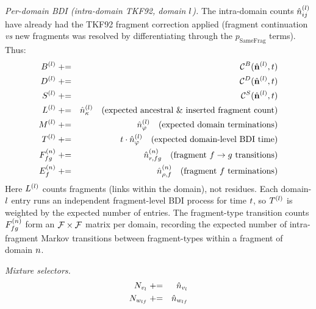 \emph{Per-domain BDI (intra-domain TKF92, domain $l$).}
The intra-domain counts $\hat{n}^{(l)}_{ij}$ have already had the TKF92 fragment correction applied
(fragment continuation {\em vs} new fragments was resolved by differentiating through the $p_\text{SameFrag}$ terms).
Thus:
\begin{eqnarray*}
B^{(l)} & \mathrel{+}= & \mathcal{C}^B(\hat{\bf n}^{(l)},t) \\
D^{(l)} & \mathrel{+}= & \mathcal{C}^D(\hat{\bf n}^{(l)},t) \\
S^{(l)} & \mathrel{+}= & \mathcal{C}^S(\hat{\bf n}^{(l)},t) \\
L^{(l)} & \mathrel{+}= & \hat{n}^{(l)}_\kappa
\quad \text{(expected ancestral \& inserted fragment count)} \\
M^{(l)} & \mathrel{+}= & \hat{n}^{(l)}_{\varphi}
\quad \text{(expected domain terminations)} \\
T^{(l)} & \mathrel{+}= & t \cdot \hat{n}^{(l)}_{\varphi}
\quad \text{(expected domain-level BDI time)} \\
F^{(n)}_{fg} & \mathrel{+}= & \hat{n}^{(n)}_{r,fg}
\quad \text{(fragment $f \to g$ transitions)} \\
E^{(n)}_{f} & \mathrel{+}= & \hat{n}^{(n)}_{\rho,f}
\quad \text{(fragment $f$ terminations)}
\end{eqnarray*}
Here $L^{(l)}$ counts fragments (links within the domain), not residues.
Each domain-$l$ entry runs an independent fragment-level BDI process
for time $t$, so $T^{(l)}$ is weighted by the expected number of entries.
The fragment-type transition counts $F^{(n)}_{fg}$ form an $\mathcal{F} \times \mathcal{F}$ matrix per domain,
recording the expected number of intra-fragment Markov transitions between fragment-types within a fragment of domain $n$.

\emph{Mixture selectors.}
\begin{eqnarray*}
N_{v_l} & \mathrel{+}= & \hat{n}_{v_l} \\
N_{w_{lf}} & \mathrel{+}= & \hat{n}_{w_{lf}} \\
\end{eqnarray*}

